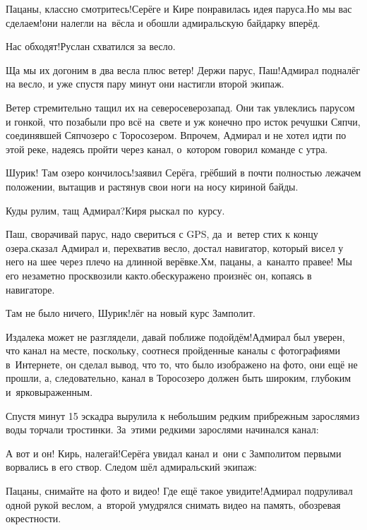 \diagdash Пацаны, классно смотритесь!\mdash Серёге и Кире понравилась идея паруса.\mdash Но мы вас сделаем!\mdash они налегли на~вёсла и обошли адмиральскую байдарку вперёд.

\diagdash Нас обходят!\mdash Руслан схватился за весло.

\diagdash Ща мы их догоним в два весла плюс ветер! Держи парус, Паш!\mdash Адмирал подналёг на весло, и уже спустя пару минут они настигли второй экипаж.

Ветер стремительно тащил их на северо\sdash северо\sdash запад. Они так увлеклись парусом и гонкой, что позабыли про всё на~свете и уж конечно про исток речушки Сяпчи, соединявшей Сяпчозеро с Торосозером. Впрочем, Адмирал и не хотел идти по этой реке, надеясь пройти через канал, о~котором говорил команде с утра.

\diagdash Шурик! Там озеро кончилось!\mdash заявил Серёга, грёбший в почти полностью лежачем положении, вытащив и растянув свои ноги на носу кириной байды.

\diagdash Куды рулим, тащ Адмирал?\mdash Киря рыскал по~курсу.

\diagdash Паш, сворачивай парус, надо свериться с GPS, да~и~ветер стих к концу озера.\mdash сказал Адмирал и, перехватив весло, достал навигатор, который висел у него на шее через плечо на длинной верёвке.\mdash Хм, пацаны, а~канал\sdash то правее! Мы его незаметно просквозили как\sdash то.\mdash обескуражено произнёс он, копаясь в навигаторе.

\diagdash Там не было ничего, Шурик!\mdash лёг на новый курс Замполит.

\diagdash Издалека может не разглядели, давай поближе подойдём!\mdash Адмирал был уверен, что канал на месте, поскольку, соотнеся пройденные каналы с фотографиями в~Интернете, он сделал вывод, что то, что было изображено на фото, они ещё не прошли, а, следовательно, канал в Торосозеро должен быть широким, глубоким и~ярковыраженным. 

Спустя минут 15 эскадра вырулила к небольшим редким прибрежным зарослям\mdash из воды торчали тростинки. За~этими редкими зарослями начинался канал:

\diagdash А вот и он! Кирь, налегай!\mdash Серёга увидал канал и~они с Замполитом первыми ворвались в его створ. Следом шёл адмиральский экипаж:

\diagdash Пацаны, снимайте на фото и видео! Где ещё такое увидите!\mdash Адмирал подруливал одной рукой веслом, а~второй умудрялся снимать видео на память, обозревая окрестности.

